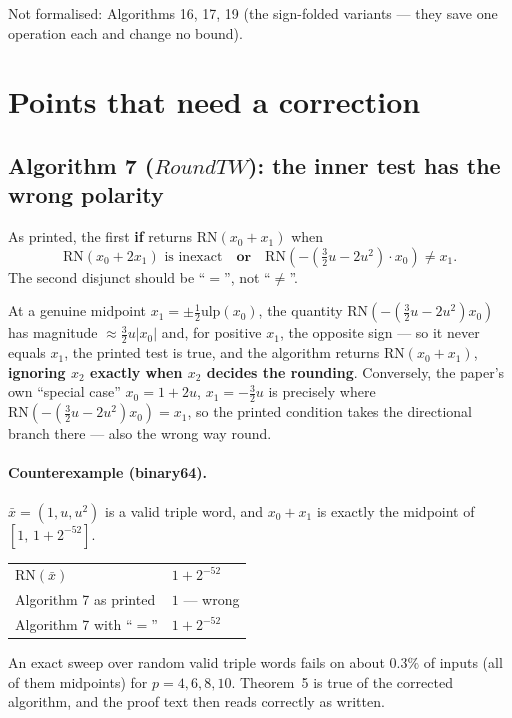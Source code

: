 \documentclass[11pt,a4paper]{article}
\newcommand{\RN}{\mathrm{RN}}
\newcommand{\ulp}{\mathrm{ulp}}
\newcommand{\alg}[1]{\mathit{#1}}
\begin{document}
Not formalised: Algorithms 16, 17, 19 (the sign-folded variants --- they save
one operation each and change no bound).

\section{Points that need a correction}

\subsection{Algorithm 7 ($\alg{RoundTW}$): the inner test has the wrong
polarity}\label{sec:roundtw}

As printed, the first \textbf{if} returns $\RN(x_0+x_1)$ when
\[
  \RN(x_0 + 2x_1) \text{ is inexact}
  \quad\textbf{or}\quad
  \RN\!\left(-\left(\tfrac32 u - 2u^2\right)\!\cdot x_0\right) \neq x_1 .
\]
The second disjunct should be ``$=$'', not ``$\neq$''.

At a genuine midpoint $x_1 = \pm\frac12\ulp(x_0)$, the quantity
$\RN(-(\frac32 u - 2u^2)x_0)$ has magnitude $\approx \frac32 u|x_0|$ and, for
positive $x_1$, the opposite sign --- so it never equals $x_1$, the printed
test is true, and the algorithm returns $\RN(x_0+x_1)$, \textbf{ignoring $x_2$
exactly when $x_2$ decides the rounding}. Conversely, the paper's own
``special case'' $x_0 = 1+2u$, $x_1 = -\frac32 u$ is precisely where
$\RN(-(\frac32 u - 2u^2)x_0) = x_1$, so the printed condition takes the
directional branch there --- also the wrong way round.

\paragraph{Counterexample (binary64).}
$\bar x = (1, u, u^2)$ is a valid triple word, and $x_0 + x_1$ is exactly the
midpoint of $[1,\, 1+2^{-52}]$.

\begin{center}
\begin{tabular}{@{}ll@{}}
\toprule
$\RN(\bar x)$                    & $1 + 2^{-52}$ \\
Algorithm 7 as printed           & $1$ \quad --- wrong \\
Algorithm 7 with ``$=$''         & $1 + 2^{-52}$ \\
\bottomrule
\end{tabular}
\end{center}

\noindent
An exact sweep over random valid triple words fails on about $0.3\%$ of
inputs (all of them midpoints) for $p = 4, 6, 8, 10$. Theorem~5 is true of the
corrected algorithm, and the proof text then reads correctly as written.
\end{document}
